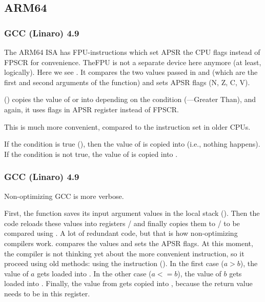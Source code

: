 \subsection{ARM64}

\subsubsection{\Optimizing GCC (Linaro) 4.9}



The ARM64 \ac{ISA} has FPU-instructions 
which set \ac{APSR} the CPU flags instead of \ac{FPSCR} for convenience.
The\ac{FPU} is not a separate device here anymore (at least, logically).
Here we see . It compares the two values passed in  and  (which are the first and second arguments of the function)
and sets \ac{APSR} flags (N, Z, C, V).

 () copies the value of  or  into  depending on the condition (---Greater Than),
and again, it uses flags in \ac{APSR} register instead of \ac{FPSCR}.

This is much more convenient, compared to the instruction set in older CPUs.

If the condition is true (), then the value of  
is copied into  (i.e., nothing happens).
If the condition is not true, the value of  
is copied into .

\subsubsection{\NonOptimizing GCC (Linaro) 4.9}



Non-optimizing GCC is more verbose.

First, the function saves its input argument values in the local stack ().
Then the code reloads these values into registers
/ and finally copies them to 
/ to be compared using . 
A lot of redundant code, 
but that is how non-optimizing compilers work.
 compares the values and sets the \ac{APSR} flags.
At this moment, 
the compiler is not thinking yet about the more convenient  instruction, so it proceed using old methods: 
using the  instruction ().
In the first case ($a>b$), the value of $a$ gets loaded 
into .
In the other case ($a<=b$), the value of $b$ gets loaded into 
.
Finally, the value from  gets copied into , 
because the return value needs to be in this 
register.

